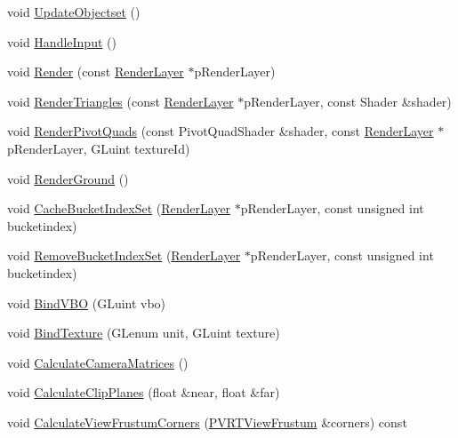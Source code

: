 \begin{DoxyCompactItemize}
\item 
void \hyperlink{class_o_g_l_e_s3_navigation_a51aa00b672b669b0566ff173de618451}{Update\+Objectset} ()
\item 
void \hyperlink{class_o_g_l_e_s3_navigation_aaddb6f1f3de803fbfe1ac795d612ff7f}{Handle\+Input} ()
\item 
void \hyperlink{class_o_g_l_e_s3_navigation_a00a8d2cd1327439e76d51470ad011a26}{Render} (const \hyperlink{struct_render_layer}{Render\+Layer} $\ast$p\+Render\+Layer)
\item 
void \hyperlink{class_o_g_l_e_s3_navigation_adafdab5873d1e42ee4804f31037f3d5c}{Render\+Triangles} (const \hyperlink{struct_render_layer}{Render\+Layer} $\ast$p\+Render\+Layer, const Shader \&shader)
\item 
void \hyperlink{class_o_g_l_e_s3_navigation_a25e69e7562068bf842610e9505ba3f00}{Render\+Pivot\+Quads} (const Pivot\+Quad\+Shader \&shader, const \hyperlink{struct_render_layer}{Render\+Layer} $\ast$p\+Render\+Layer, G\+Luint texture\+Id)
\item 
void \hyperlink{class_o_g_l_e_s3_navigation_a324aad301611161cf1677dd453bf197c}{Render\+Ground} ()
\item 
void \hyperlink{class_o_g_l_e_s3_navigation_aa68d5268322e4e7fe9cd5ae1396c3671}{Cache\+Bucket\+Index\+Set} (\hyperlink{struct_render_layer}{Render\+Layer} $\ast$p\+Render\+Layer, const unsigned int bucketindex)
\item 
void \hyperlink{class_o_g_l_e_s3_navigation_a645e596ec897870a7c5a97240f91f155}{Remove\+Bucket\+Index\+Set} (\hyperlink{struct_render_layer}{Render\+Layer} $\ast$p\+Render\+Layer, const unsigned int bucketindex)
\item 
void \hyperlink{class_o_g_l_e_s3_navigation_aecdec4d9f100b81bea09b8c1635aa28e}{Bind\+V\+B\+O} (G\+Luint vbo)
\item 
void \hyperlink{class_o_g_l_e_s3_navigation_a4658bbfbb5b67a46453d30c6e10f31e8}{Bind\+Texture} (G\+Lenum unit, G\+Luint texture)
\item 
void \hyperlink{class_o_g_l_e_s3_navigation_aea1e6f22384ef4e596935bd4e653005b}{Calculate\+Camera\+Matrices} ()
\item 
void \hyperlink{class_o_g_l_e_s3_navigation_aab5e74012376a35e82633e7d300251e0}{Calculate\+Clip\+Planes} (float \&near, float \&far)
\item 
void \hyperlink{class_o_g_l_e_s3_navigation_a47a76182423a722d7597fd885fe35e7e}{Calculate\+View\+Frustum\+Corners} (\hyperlink{struct_p_v_r_t_view_frustum}{P\+V\+R\+T\+View\+Frustum} \&corners) const 

\end{DoxyCompactItemize}
